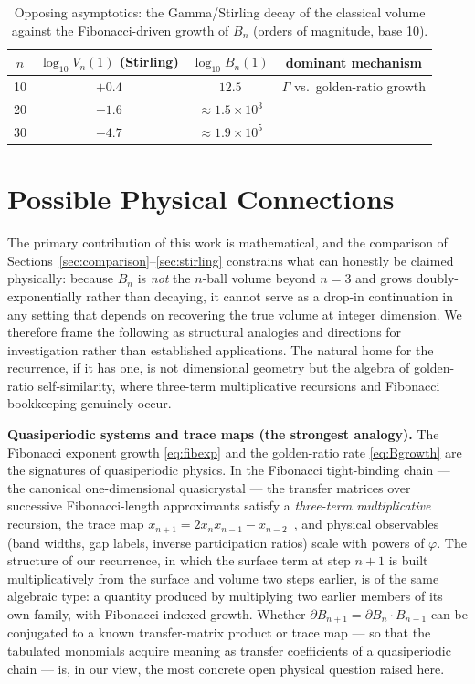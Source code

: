 \documentclass[11pt,a4paper]{article}
\theoremstyle{definition}
\begin{document}
\begin{table}[h]
\centering
\caption{Opposing asymptotics: the Gamma/Stirling decay of the classical volume against the Fibonacci-driven growth of \(B_n\) (orders of magnitude, base 10).}
\label{tab:asym}
\begin{tabular}{@{}cccc@{}}
\toprule
\(n\) & \(\log_{10} V_n(1)\) (Stirling) & \(\log_{10} B_n(1)\) & dominant mechanism \\
\midrule
10 & \(+0.4\)  & \(12.5\)      & \(\Gamma\) vs.\ golden-ratio growth \\
20 & \(-1.6\)  & \(\approx 1.5\times10^{3}\)  & \\
30 & \(-4.7\)  & \(\approx 1.9\times10^{5}\) & \\
\bottomrule
\end{tabular}
\end{table}

\section{Possible Physical Connections}

The primary contribution of this work is mathematical, and the comparison of Sections~\ref{sec:comparison}--\ref{sec:stirling} constrains what can honestly be claimed physically: because \(B_n\) is \emph{not} the \(n\)-ball volume beyond \(n=3\) and grows doubly-exponentially rather than decaying, it cannot serve as a drop-in continuation in any setting that depends on recovering the true volume at integer dimension. We therefore frame the following as structural analogies and directions for investigation rather than established applications. The natural home for the recurrence, if it has one, is not dimensional geometry but the algebra of golden-ratio self-similarity, where three-term multiplicative recursions and Fibonacci bookkeeping genuinely occur.

\textbf{Quasiperiodic systems and trace maps (the strongest analogy).} The Fibonacci exponent growth \eqref{eq:fibexp} and the golden-ratio rate \eqref{eq:Bgrowth} are the signatures of quasiperiodic physics. In the Fibonacci tight-binding chain --- the canonical one-dimensional quasicrystal --- the transfer matrices over successive Fibonacci-length approximants satisfy a \emph{three-term multiplicative} recursion, the trace map \(x_{n+1}=2x_nx_{n-1}-x_{n-2}\)~\cite{kohmoto1983}, and physical observables (band widths, gap labels, inverse participation ratios) scale with powers of \(\varphi\). The structure of our recurrence, in which the surface term at step \(n+1\) is built multiplicatively from the surface and volume two steps earlier, is of the same algebraic type: a quantity produced by multiplying two earlier members of its own family, with Fibonacci-indexed growth. Whether \(\partial B_{n+1}=\partial B_n\cdot B_{n-1}\) can be conjugated to a known transfer-matrix product or trace map --- so that the tabulated monomials acquire meaning as transfer coefficients of a quasiperiodic chain --- is, in our view, the most concrete open physical question raised here.
\end{document}

